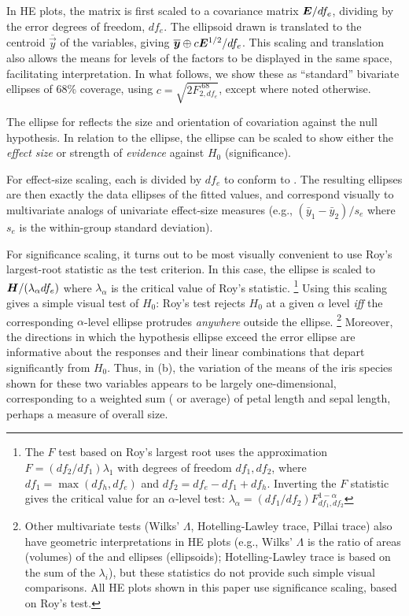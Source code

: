 In HE plots, the  matrix is first scaled to a covariance matrix
$\bm{E}/df_e$, dividing by the error degrees of freedom, $df_e$.
The ellipsoid drawn is
translated to the centroid $\overline{\vec{y}}$ of the variables,
giving $\overline{\bm{y}} \oplus c \bm{E}^{1/2}/df_e$.
This scaling and translation
also allows the means for levels of the factors
to be displayed in the same space,
facilitating interpretation.
In what follows, we show these as
``standard'' bivariate ellipses of 68\% coverage,
using $c=\sqrt{2 F_{2, df_e}^{.68}}$, except where noted otherwise.

The ellipse for  reflects the size and orientation of covariation
against the null hypothesis.
In relation to the  ellipse, the  ellipse
can be scaled to show either the \emph{effect size} or strength of
\emph{evidence} against $H_0$ (significance).

For effect-size scaling, each  is divided by $df_e$ to conform
to .  The resulting ellipses are then exactly the data ellipses
of the fitted values, and correspond visually to multivariate analogs of
univariate effect-size measures (e.g., $(\bar{y}_1 - \bar{y}_2)/s_e$
where $s_e$ is the within-group standard deviation).

For significance scaling, it turns out to be most visually convenient to
use Roy's largest-root statistic as the test criterion.
In this case,
the  ellipse is scaled to $\bm{H}/(\lambda_\alpha df_e)$
where $\lambda_\alpha$ is the critical value of Roy's statistic.%
\footnote{
The $F$ test based on Roy's largest root uses the approximation
$ F = (df_2 / df_1) \lambda_1$ with degrees of freedom $df_1, df_2$,
where $df_1 = \max (df_h, df_e)$ and $df_2 = df_e - df_1 + df_h$.
Inverting the $F$ statistic gives the critical value for an $\alpha$-level test:
$\lambda_\alpha = (df_1/df_2) F^{1-\alpha}_{df_1,df_2}$
}
Using this scaling gives a simple visual test of
$H_0$: Roy's test rejects $H_0$ at a given $\alpha$ level \emph{iff}
the corresponding $\alpha$-level  ellipse protrudes \emph{anywhere} outside the 
ellipse.%
\footnote{Other multivariate tests (Wilks' $\Lambda$, Hotelling-Lawley trace,
Pillai trace) also have geometric interpretations
in HE plots (e.g.,  Wilks' $\Lambda$ is the ratio of areas (volumes)
of the  and  ellipses (ellipsoids); Hotelling-Lawley trace
is based on the sum of the $\lambda_i$), but these statistics do not provide
such simple visual comparisons. All HE plots shown in this paper use
significance scaling, based on Roy's test.
}
Moreover, the directions in which the hypothesis ellipse exceed the error ellipse
are informative about the responses and their linear combinations that depart significantly
from $H_0$.  Thus, in (b), the variation of the means of the iris species
shown for these two variables
appears to be largely one-dimensional, corresponding to a weighted sum ( or average) of petal length and
sepal length, perhaps a measure of overall size.


